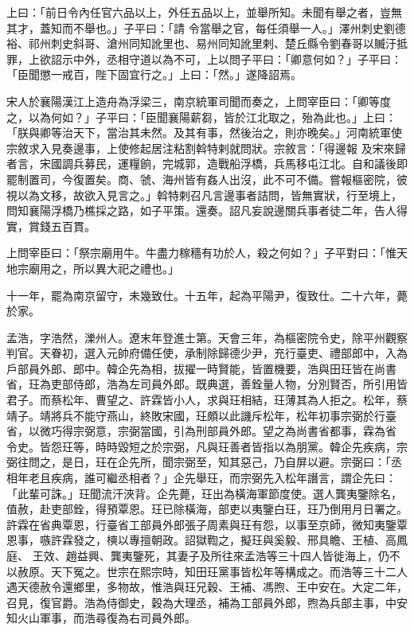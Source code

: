 \begin{pinyinscope}
 上曰：「前日令內任官六品以上，外任五品以上，並舉所知。未聞有舉之者，豈無其才，蓋知而不舉也。」子平曰：「請
 令當舉之官，每任須舉一人。」澤州刺史劉德裕、祁州刺史斜哥、滄州同知訛里也、易州同知訛里剌、楚丘縣令劉春哥以贓汙抵罪，上欲詔示中外，丞相守道以為不可，上以問子平曰：「卿意何如？」子平曰：「臣聞懲一戒百，陛下固宜行之。」上曰：「然。」遂降詔焉。



 宋人於襄陽漢江上造舟為浮梁三，南京統軍司聞而奏之，上問宰臣曰：「卿等度之，以為何如？」子平曰：「臣聞襄陽薪芻，皆於江北取之，殆為此也。」上曰：「朕與卿等治天下，當治其未然。及其有事，然後治之，則亦晚矣。」河南統軍使宗敘求入見奏邊事，上使修起居注粘割斡特剌就問狀。宗敘言：「得邊報
 及宋來歸者言，宋國調兵募民，運糧餉，完城郭，造戰船浮橋，兵馬移屯江北。自和議後即罷制置司，今復置矣。商、虢、海州皆有姦人出沒，此不可不備。嘗報樞密院，彼視以為文移，故欲入見言之。」斡特剌召凡言邊事者詰問，皆無實狀，行至境上，問知襄陽浮橋乃樵採之路，如子平策。還奏。詔凡妄說邊關兵事者徒二年，告人得實，賞錢五百貫。



 上問宰臣曰：「祭宗廟用牛。牛盡力稼穡有功於人，殺之何如？」子平對曰：「惟天地宗廟用之，所以異大祀之禮也。」



 十一年，罷為南京留守，未幾致仕。十五年，起為平陽尹，復致仕。二十六年，薨於家。



 孟浩，字浩然，濼州人。遼末年登進士第。天會三年，為樞密院令史，除平州觀察判官。天眷初，選入元帥府備任使，承制除歸德少尹，充行臺吏、禮部郎中，入為戶部員外郎、郎中。韓企先為相，拔擢一時賢能，皆置機要，浩與田玨皆在尚書省，玨為吏部侍郎，浩為左司員外郎。既典選，善銓量人物，分別賢否，所引用皆君子。而蔡松年、曹望之、許霖皆小人，求與玨相結，玨薄其為人拒之。松年，蔡靖子。靖將兵不能守燕山，終敗宋國，玨頗以此譏斥松年，松年初事宗弼於行臺省，以微巧得宗弼意，宗弼當國，引為刑部員外郎。望之為尚書省都事，霖為省
 令史。皆怨玨等，時時毀短之於宗弼，凡與玨善者皆指以為朋黨。韓企先疾病，宗弼往問之，是日，玨在企先所，聞宗弼至，知其惡己，乃自屏以避。宗弼曰：「丞相年老且疾病，誰可繼丞相者？」企先舉玨，而宗弼先入松年譖言，謂企先曰：「此輩可誅。」玨聞流汗浹背。企先薨，玨出為橫海軍節度使。選人龔夷鑒除名，值赦，赴吏部銓，得預覃恩。玨已除橫海，部吏以夷鑒白玨，玨乃倒用月日署之。許霖在省典覃恩，行臺省工部員外郎張子周素與玨有怨，以事至京師，微知夷鑒覃恩事，嗾許霖發之，樉以專擅朝政。詔獄鞫之，擬玨與奚毅、邢具瞻、王植、高鳳庭、
 王效、趙益興、龔夷鑒死，其妻子及所往來孟浩等三十四人皆徙海上，仍不以赦原。天下冤之。世宗在熙宗時，知田玨黨事皆松年等構成之。而浩等三十二人遇天德赦令還鄉里，多物故，惟浩與玨兄穀、王補、馮煦、王中安在。大定二年，召見，復官爵。浩為侍御史，穀為大理丞，補為工部員外郎，煦為兵部主事，中安知火山軍事，而浩尋復為右司員外郎。




\end{pinyinscope}
